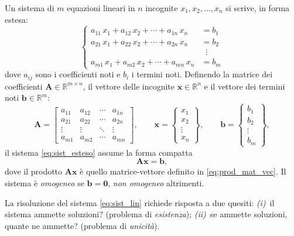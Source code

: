 Un sistema di $m$ equazioni lineari in $n$ incognite $x_1, x_2, \ldots, x_n$ si scrive, in forma estesa:
\begin{equation}\label{eq:sist_esteso}
	\left\{
	\begin{aligned}
		a_{11}\,x_1 + a_{12}\,x_2 + \cdots + a_{1n}\,x_n &= b_1 \\
		a_{21}\,x_1 + a_{22}\,x_2 + \cdots + a_{2n}\,x_n &= b_2 \\
		&\;\;\vdots \\
		a_{m1}\,x_1 + a_{m2}\,x_2 + \cdots + a_{mn}\,x_n &= b_m
	\end{aligned}
	\right.
\end{equation}
dove $a_{ij}$ sono i coefficienti noti e $b_i$ i termini noti. Definendo la matrice dei coefficienti $\bm{A}\in\mathbb{R}^{m\times n}$, il vettore delle incognite $\bm{x} \in \mathbb{R}^{n}$ e il vettore dei termini noti $\bm{b} \in \mathbb{R}^{m}$:
\begin{equation}
	\bm{A}=\begin{bmatrix}
		a_{11} & a_{12} & \cdots & a_{1n}\\
		a_{21} & a_{22} & \cdots & a_{2n}\\
		\vdots & \vdots & \ddots & \vdots\\
		a_{m1} & a_{m2} & \cdots & a_{mn}
	\end{bmatrix}, \qquad
	\bm{x}=\begin{Bmatrix} x_{1}\\ x_{2}\\ \vdots \\ x_{n} \end{Bmatrix}, \qquad
	\bm{b}=\begin{Bmatrix} b_{1}\\ b_{2}\\ \vdots \\ b_{m} \end{Bmatrix},
\end{equation}
il sistema \eqref{eq:sist_esteso} assume la forma compatta
\begin{equation}\label{eq:sist_lin}
	\bm{A}\bm{x} = \bm{b},
\end{equation}
dove il prodotto $\bm{A}\bm{x}$ \`e quello matrice-vettore definito in \eqref{eq:prod_mat_vec}. Il sistema \`e \textit{omogeneo} se $\bm{b}=\bm{0}$, \textit{non omogeneo} altrimenti.

La risoluzione del sistema \eqref{eq:sist_lin} richiede risposta a due quesiti: \textit{(i)}~il sistema ammette soluzioni? (problema di \textit{esistenza}); \textit{(ii)}~se ammette soluzioni, quante ne ammette? (problema di \textit{unicit\`a}).



